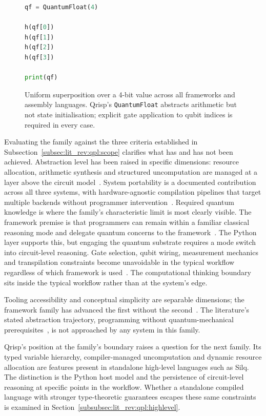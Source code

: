 \begin{figure}[htbp]
\begin{minipage}[t]{0.44\textwidth}
\begin{lstlisting}[basicstyle=\ttfamily\scriptsize,
            language=Python,
            frame=single,
            label={lst:lit_rev:qpl:superposition_qrisp}]
qf = QuantumFloat(4)

h(qf[0])
h(qf[1])
h(qf[2])
h(qf[3])

print(qf)
        \end{lstlisting}
    \end{minipage}
    \caption{Uniform superposition over a 4-bit value across all frameworks and assembly languages.
    Qrisp's \texttt{QuantumFloat} abstracts arithmetic but not state initialisation; explicit gate application to qubit indices is required in every case.}
    \label{fig:lit_rev:qpl:superposition_comparison}
\end{figure}

Evaluating the family against the three criteria established in Subsection~\ref{subsec:lit_rev:qpl:scope} clarifies what has and has not been achieved.
Abstraction level has been raised in specific dimensions: resource allocation, arithmetic synthesis and structured uncomputation are managed at a layer above the circuit model~\cite{seidel2024qrisp, aleksandrowicz2019qiskit}.
System portability is a documented contribution across all three systems, with hardware-agnostic compilation pipelines that target multiple backends without programmer intervention~\cite{aleksandrowicz2019qiskit, bergholm2018pennylane}.
Required quantum knowledge is where the family's characteristic limit is most clearly visible.
The framework premise is that programmers can remain within a familiar classical reasoning mode and delegate quantum concerns to the framework~\cite{Wing2006ComputationalThinking}.
The Python layer supports this, but engaging the quantum substrate requires a mode switch into circuit-level reasoning.
Gate selection, qubit wiring, measurement mechanics and transpilation constraints become unavoidable in the typical workflow regardless of which framework is used~\cite{ferreira2024qplusage, murillo2022sequantumprogramming}.
The computational thinking boundary sits inside the typical workflow rather than at the system's edge.

Tooling accessibility and conceptual simplicity are separable dimensions; the framework family has advanced the first without the second~\cite{ferreira2024qplusage, murillo2022sequantumprogramming}.
The literature's stated abstraction trajectory, programming without quantum-mechanical prerequisites~\cite{cobb2022higherlevelabstractions}, is not approached by any system in this family.

Qrisp's position at the family's boundary raises a question for the next family.
Its typed variable hierarchy, compiler-managed uncomputation and dynamic resource allocation are features present in standalone high-level languages such as Silq.
The distinction is the Python host model and the persistence of circuit-level reasoning at specific points in the workflow.
Whether a standalone compiled language with stronger type-theoretic guarantees escapes these same constraints is examined in Section~\ref{subsubsec:lit_rev:qpl:highlevel}.

